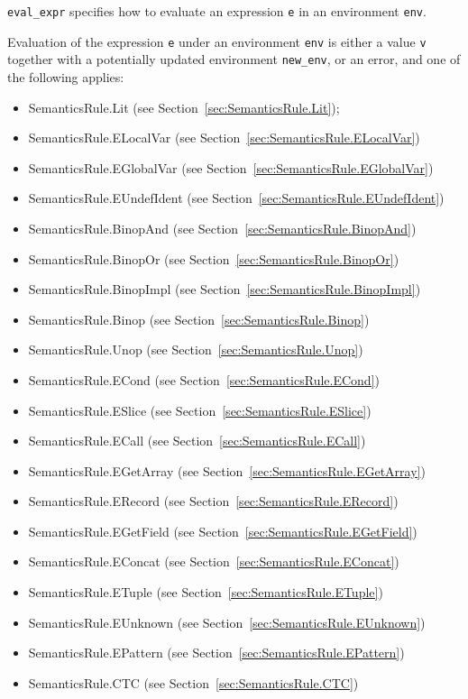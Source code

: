 \documentclass{book}
\begin{document}
\texttt{eval\_expr} specifies how to evaluate an expression \texttt{e} in an
environment \texttt{env}. 

Evaluation of the expression \texttt{e} under an environment \texttt{env} is
either a value \texttt{v} together with a potentially updated
environment \texttt{new\_env}, or an error, and one of the following applies:
\begin{itemize}
\item SemanticsRule.Lit (see Section~\ref{sec:SemanticsRule.Lit});
\item SemanticsRule.ELocalVar (see Section~\ref{sec:SemanticsRule.ELocalVar})
\item SemanticsRule.EGlobalVar (see Section~\ref{sec:SemanticsRule.EGlobalVar})
\item SemanticsRule.EUndefIdent (see Section~\ref{sec:SemanticsRule.EUndefIdent})
\item SemanticsRule.BinopAnd (see Section~\ref{sec:SemanticsRule.BinopAnd})
\item SemanticsRule.BinopOr (see Section~\ref{sec:SemanticsRule.BinopOr})
\item SemanticsRule.BinopImpl (see Section~\ref{sec:SemanticsRule.BinopImpl})
\item SemanticsRule.Binop (see Section~\ref{sec:SemanticsRule.Binop})
\item SemanticsRule.Unop (see Section~\ref{sec:SemanticsRule.Unop})
\item SemanticsRule.ECond (see Section~\ref{sec:SemanticsRule.ECond})
\item SemanticsRule.ESlice (see Section~\ref{sec:SemanticsRule.ESlice})
\item SemanticsRule.ECall (see Section~\ref{sec:SemanticsRule.ECall})
\item SemanticsRule.EGetArray (see Section~\ref{sec:SemanticsRule.EGetArray})
\item SemanticsRule.ERecord (see Section~\ref{sec:SemanticsRule.ERecord})
\item SemanticsRule.EGetField (see Section~\ref{sec:SemanticsRule.EGetField})
\item SemanticsRule.EConcat (see Section~\ref{sec:SemanticsRule.EConcat})
\item SemanticsRule.ETuple (see Section~\ref{sec:SemanticsRule.ETuple})
\item SemanticsRule.EUnknown (see Section~\ref{sec:SemanticsRule.EUnknown})
\item SemanticsRule.EPattern (see Section~\ref{sec:SemanticsRule.EPattern})
\item SemanticsRule.CTC (see Section~\ref{sec:SemanticsRule.CTC})
\end{itemize}
\end{document}
